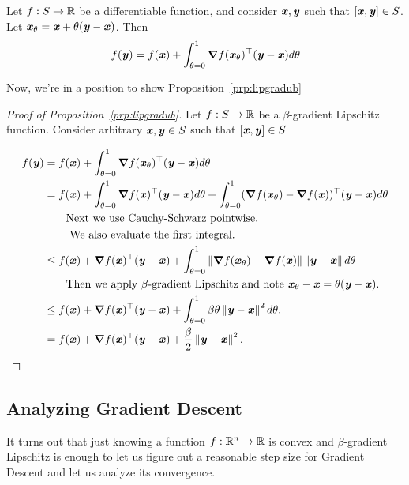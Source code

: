\begin{proposition}
  Let $f: S \to \mathbb{R}$ be a differentiable function, and consider
  $\boldsymbol{\mathit{x}}, \boldsymbol{\mathit{y}}$ such that $[\boldsymbol{\mathit{x}},\boldsymbol{\mathit{y}}] \in S$.
  Let ${\boldsymbol{\mathit{x}}_{\theta} = \boldsymbol{\mathit{x}} + \theta (\boldsymbol{\mathit{y}} - \boldsymbol{\mathit{x}})}$.
  Then
  \[
    f(\boldsymbol{\mathit{y}}) = f(\boldsymbol{\mathit{x}}) + \int_{\theta = 0}^1 \boldsymbol{\nabla} f(\boldsymbol{\mathit{x}}_{\theta})^\top (\boldsymbol{\mathit{y}}-\boldsymbol{\mathit{x}}) d\theta
    \]
\end{proposition}
Now, we're in a position to show Proposition~\ref{prp:lipgradub}
\begin{proof}[Proof of Proposition~\ref{prp:lipgradub}]
  Let $f: S \to \mathbb{R}$ be a $\beta$-gradient Lipschitz function.
  Consider arbitrary $\boldsymbol{\mathit{x}}, \boldsymbol{\mathit{y}} \in S$ such that $[\boldsymbol{\mathit{x}},\boldsymbol{\mathit{y}}] \in S$

  \begin{align*}
    f(\yy)
    &= f(\xx) + \int_{\theta = 0}^1 \grad
      f(\xx_{\theta})^\trp(\yy-\xx) d\theta
    \\
    &= f(\xx)
     + \int_{\theta = 0}^1 \grad
      f(\xx)^\trp(\yy-\xx) d\theta
      + \int_{\theta = 0}^1
      (\grad f(\xx_{\theta}) - \grad f(\xx ))^\trp(\yy-\xx) d\theta
   \\
    &         \tag*{Next we use Cauchy-Schwarz pointwise.}
 \\
    &\tag*{ We also evaluate the
      first integral.}
    \\
    &\leq f(\xx)
     + \grad f(\xx)^\trp(\yy-\xx)
      + \int_{\theta = 0}^1
      \norm{ \grad f(\xx_{\theta}) - \grad f(\xx ) } \norm{\yy-\xx}
      d\theta
    \\
    &\tag*{Then we apply $\beta$-gradient Lipschitz and note
      $\xx_\theta -\xx = \theta (\yy-\xx)$.}
    \\
    &\leq f(\xx)
     + \grad f(\xx)^\trp(\yy-\xx)
      + \int_{\theta = 0}^1
    \beta \theta \norm{\yy-\xx}^2
      d\theta
      .
      \\
    &= f(\xx)
     + \grad f(\xx)^\trp(\yy-\xx)
      + \frac{\beta}{2} \norm{\yy-\xx}^2
      .
  \end{align*}
\end{proof}

\subsection{Analyzing Gradient Descent}
It turns out that just knowing a function $f: \mathbb{R}^n \to \mathbb{R}$ is convex
and $\beta$-gradient Lipschitz is enough to let us figure out a reasonable
step size for Gradient Descent and let us analyze its convergence.

